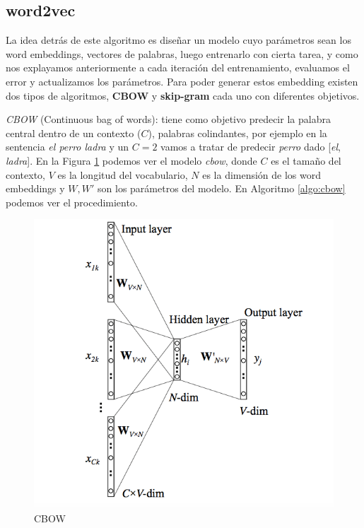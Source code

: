 \subsection{word2vec}

La idea detrás de este algoritmo es diseñar un modelo cuyo parámetros sean los word embeddings, vectores de palabras, luego entrenarlo con cierta tarea, y como nos explayamos anteriormente a cada iteración del entrenamiento, evaluamos el error y actualizamos los parámetros. Para poder generar estos embedding existen dos tipos de algoritmos, \textbf{CBOW} y \textbf{skip-gram} cada uno con diferentes objetivos.

\textit{CBOW} (Continuous bag of words): tiene como objetivo predecir la palabra central dentro de un contexto ($C$), palabras colindantes, por ejemplo en la sentencia \textit{el perro ladra} y un $C = 2$ vamos a tratar de predecir \textit{perro} dado [\textit{el}, \textit{ladra}]. En la Figura \ref{fig:word2vec_cbow} podemos ver el modelo \textit{cbow}, donde $C$ es el tamaño del contexto, $V$ es la longitud del vocabulario, $N$ es la dimensión de los word embeddings y $W, W'$ son los parámetros del modelo. En Algoritmo \ref{algo:cbow} podemos ver el procedimiento.

\begin{figure}
\begin{center}
    \includegraphics[width=\textwidth]{images/image219.png}
    \caption{CBOW}
    \label{fig:word2vec_cbow}
\end{center}
\end{figure}


